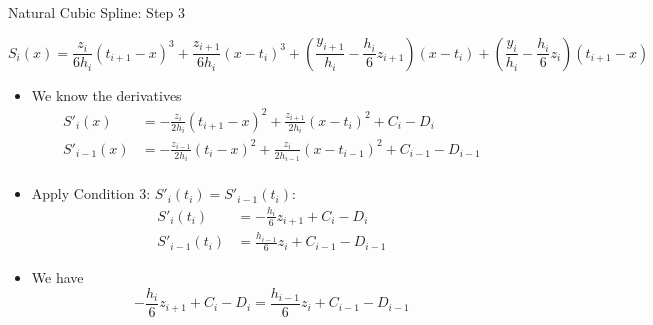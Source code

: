 \documentclass[10pt]{beamer}
\begin{document}
\begin{frame}[shrink]{Natural Cubic Spline: Step 3}
\vspace{-10pt}

\begin{equation*}
  S_i(x) = \frac{z_i}{6h_i}(t_{i+1}-x)^3
+\frac{z_{i+1}}{6h_i}(x-t_i)^3 
+\left(\frac{y_{i+1}}{h_i} - \frac{h_i}{6}z_{i+1}\right)(x-t_i)
+\left(\frac{y_i}{h_i} - \frac{h_i}{6}z_i\right) (t_{i+1}-x)
\end{equation*}\vspace{-1pt}

\begin{itemize}
    \item We know the derivatives
        \begin{align*}
          S'_i(x) &= -\frac{z_i}{2h_i}(t_{i+1}-x)^2 +\frac{z_{i+1}}{2h_i}(x-t_i)^2 + C_i-D_i\\
          S'_{i-1}(x) &= -\frac{z_{i-1}}{2h_i}(t_{i}-x)^2 +\frac{z_{i}}{2h_{i-1}}(x-t_{i-1})^2 + C_{i-1}-D_{i-1}\\
        \end{align*} 

\item Apply Condition 3: $S'_i(t_i) = S'_{i-1}(t_i)$: \vspace{-3pt}
    \begin{align*}
      S'_i(t_i) &= -\frac{h_i}{6}z_{i+1}  +C_i-D_i\\
      S'_{i-1}(t_i) &= \frac{h_{i-1}}{6}z_{i} + C_{i-1}-D_{i-1}
    \end{align*}
\item We have 
$$
-\frac{h_i}{6}z_{i+1}  +C_i-D_i = \frac{h_{i-1}}{6}z_{i} + C_{i-1}-D_{i-1}
$$
\end{itemize}
\end{frame}
\end{document}
